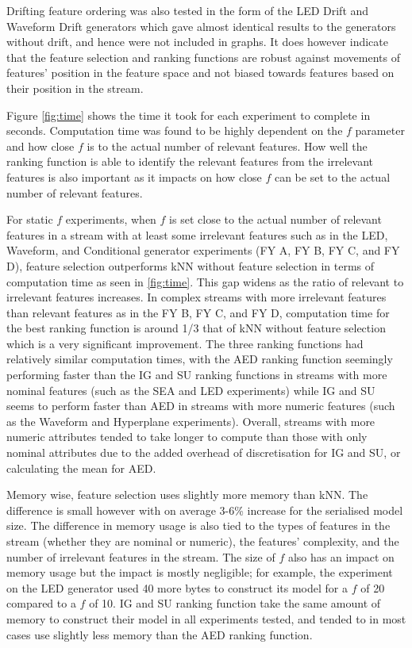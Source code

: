 Drifting feature ordering was also tested in the form of the LED Drift and Waveform Drift generators which gave almost identical results to the generators without drift, and hence were not included in graphs. It does however indicate that the feature selection and ranking functions are robust against movements of features' position in the feature space and not biased towards features based on their position in the stream.

Figure \ref{fig:time} shows the time it took for each experiment to complete in seconds. Computation time was found to be highly dependent on the $f$ parameter and how close $f$ is to the actual number of relevant features. How well the ranking function is able to identify the relevant features from the irrelevant features is also important as it impacts on how close $f$ can be set to the actual number of relevant features.

For static $f$ experiments, when $f$ is set close to the actual number of relevant features in a stream with at least some irrelevant features such as in the LED, Waveform, and Conditional generator experiments (FY A, FY B, FY C, and FY D), feature selection outperforms kNN without feature selection in terms of computation time as seen in \ref{fig:time}. This gap widens as the ratio of relevant to irrelevant features increases. In complex streams with more irrelevant features than relevant features as in the FY B, FY C, and FY D, computation time for the best ranking function is around 1/3 that of kNN without feature selection which is a very significant improvement. The three ranking functions had relatively similar computation times, with the AED ranking function seemingly performing faster than the IG and SU ranking functions in streams with more nominal features (such as the SEA and LED experiments) while IG and SU seems to perform faster than AED in streams with more numeric features (such as the Waveform and Hyperplane experiments). Overall, streams with more numeric attributes tended to take longer to compute than those with only nominal attributes due to the added overhead of discretisation for IG and SU, or calculating the mean for AED.

Memory wise, feature selection uses slightly more memory than kNN. The difference is small however with on average 3-6\% increase for the serialised model size. The difference in memory usage is also tied to the types of features in the stream (whether they are nominal or numeric), the features' complexity, and the number of irrelevant features in the stream. The size of $f$ also has an impact on memory usage but the impact is mostly negligible; for example, the experiment on the LED generator used 40 more bytes to construct its model for a $f$ of 20 compared to a $f$ of 10. IG and SU ranking function take the same amount of memory to construct their model in all experiments tested, and tended to in most cases use slightly less memory than the AED ranking function.

